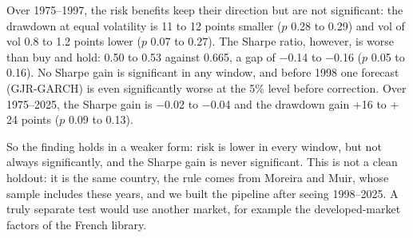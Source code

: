 Over 1975--1997, the risk benefits keep their direction but are not significant: the drawdown at equal volatility is 11 to 12 points smaller ($p$ 0.28 to 0.29) and vol of vol 0.8 to 1.2 points lower ($p$ 0.07 to 0.27). The Sharpe ratio, however, is worse than buy and hold: 0.50 to 0.53 against 0.665, a gap of $-$0.14 to $-$0.16 ($p$ 0.05 to 0.16). No Sharpe gain is significant in any window, and before 1998 one forecast (GJR-GARCH) is even significantly worse at the 5\% level before correction. Over 1975--2025, the Sharpe gain is $-$0.02 to $-$0.04 and the drawdown gain $+$16 to $+$24 points ($p$ 0.09 to 0.13).

So the finding holds in a weaker form: risk is lower in every window, but not always significantly, and the Sharpe gain is never significant. This is not a clean holdout: it is the same country, the rule comes from Moreira and Muir, whose sample includes these years, and we built the pipeline after seeing 1998--2025. A truly separate test would use another market, for example the developed-market factors of the French library.

